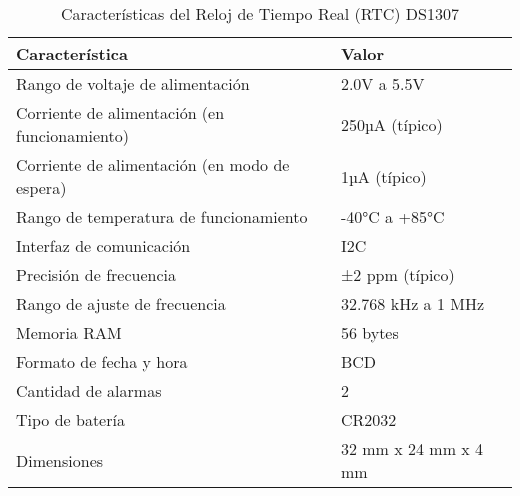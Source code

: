 \begin{table}%
\centering
\caption{Características del Reloj de Tiempo Real (RTC) DS1307}
\label{tab:rtc_ds1307_caracteristicas}
\begin{tabular}{ll}
\toprule
\textbf{Característica}                              & \textbf{Valor}                       \\ 
\midrule
Rango de voltaje de alimentación                     & 2.0V a 5.5V                          \\ 
Corriente de alimentación (en funcionamiento)        & 250µA (típico)                       \\ 
Corriente de alimentación (en modo de espera)        & 1µA (típico)                         \\ 
Rango de temperatura de funcionamiento               & -40°C a +85°C                        \\ 
Interfaz de comunicación                             & I2C                                  \\ 
Precisión de frecuencia                              & ±2 ppm (típico)                      \\ 
Rango de ajuste de frecuencia                        & 32.768 kHz a 1 MHz                   \\
Memoria RAM                                          & 56 bytes                             \\
Formato de fecha y hora                              & BCD                                  \\
Cantidad de alarmas                                  & 2                                    \\ 
Tipo de batería                                      & CR2032                \\ 
Dimensiones                                          & 32 mm x 24 mm x 4 mm                 \\ \bottomrule
\end{tabular}
\end{table}